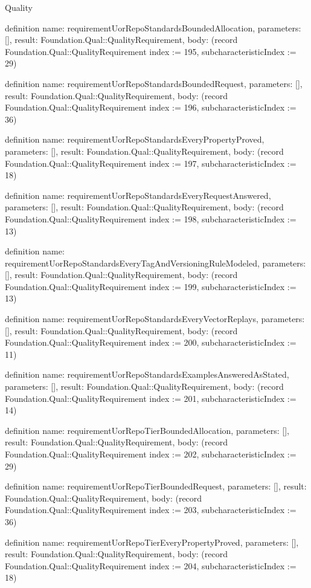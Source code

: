 \begin{lexlean}{Quality}
\begin{semanticmodule}
definition{
  name: requirementUorRepoStandardsBoundedAllocation,
  parameters: [],
  result: Foundation.Qual::QualityRequirement,
  body: (record Foundation.Qual::QualityRequirement {index := 195, subcharacteristicIndex := 29})
}

definition{
  name: requirementUorRepoStandardsBoundedRequest,
  parameters: [],
  result: Foundation.Qual::QualityRequirement,
  body: (record Foundation.Qual::QualityRequirement {index := 196, subcharacteristicIndex := 36})
}

definition{
  name: requirementUorRepoStandardsEveryPropertyProved,
  parameters: [],
  result: Foundation.Qual::QualityRequirement,
  body: (record Foundation.Qual::QualityRequirement {index := 197, subcharacteristicIndex := 18})
}

definition{
  name: requirementUorRepoStandardsEveryRequestAnswered,
  parameters: [],
  result: Foundation.Qual::QualityRequirement,
  body: (record Foundation.Qual::QualityRequirement {index := 198, subcharacteristicIndex := 13})
}

definition{
  name: requirementUorRepoStandardsEveryTagAndVersioningRuleModeled,
  parameters: [],
  result: Foundation.Qual::QualityRequirement,
  body: (record Foundation.Qual::QualityRequirement {index := 199, subcharacteristicIndex := 13})
}

definition{
  name: requirementUorRepoStandardsEveryVectorReplays,
  parameters: [],
  result: Foundation.Qual::QualityRequirement,
  body: (record Foundation.Qual::QualityRequirement {index := 200, subcharacteristicIndex := 11})
}

definition{
  name: requirementUorRepoStandardsExamplesAnsweredAsStated,
  parameters: [],
  result: Foundation.Qual::QualityRequirement,
  body: (record Foundation.Qual::QualityRequirement {index := 201, subcharacteristicIndex := 14})
}

definition{
  name: requirementUorRepoTierBoundedAllocation,
  parameters: [],
  result: Foundation.Qual::QualityRequirement,
  body: (record Foundation.Qual::QualityRequirement {index := 202, subcharacteristicIndex := 29})
}

definition{
  name: requirementUorRepoTierBoundedRequest,
  parameters: [],
  result: Foundation.Qual::QualityRequirement,
  body: (record Foundation.Qual::QualityRequirement {index := 203, subcharacteristicIndex := 36})
}

definition{
  name: requirementUorRepoTierEveryPropertyProved,
  parameters: [],
  result: Foundation.Qual::QualityRequirement,
  body: (record Foundation.Qual::QualityRequirement {index := 204, subcharacteristicIndex := 18})
}


\end{semanticmodule}
\end{lexlean}
